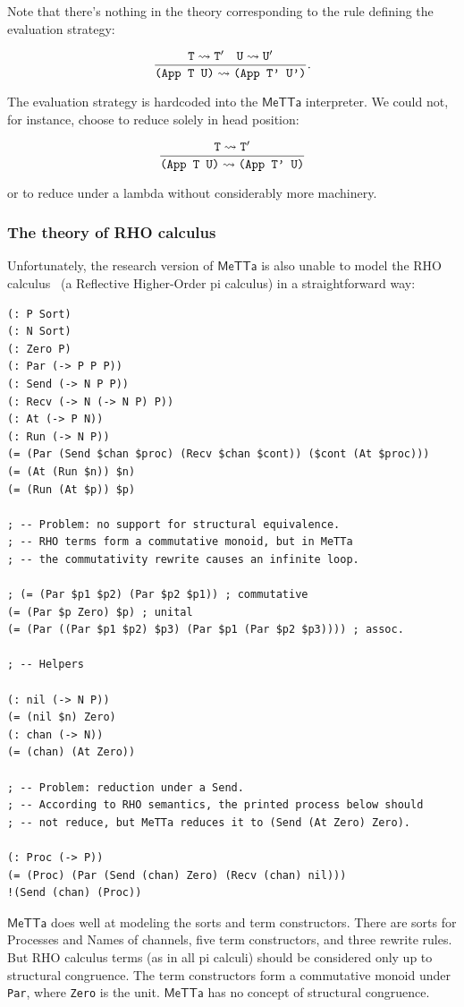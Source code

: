 \documentclass{article}
\begin{document}
Note that there's nothing in the theory corresponding to the rule
defining the evaluation strategy:

\[ \frac{{\tt T} \leadsto {\tt T'} \quad {\tt U} \leadsto {\tt U'}}{\mbox{\tt (App T U)} \leadsto \mbox{\tt (App T' U')}}. \]

The evaluation strategy is hardcoded into the $\mathsf{MeTTa}$
interpreter.  We could not, for instance, choose to reduce solely in
head position:

\[ \frac{{\tt T} \leadsto {\tt T'}}{\mbox{\tt (App T U)} \leadsto \mbox{\tt (App T' U)}} \]

or to reduce under a lambda without considerably more machinery.

\subsubsection{The theory of RHO calculus}

Unfortunately, the research version of $\mathsf{MeTTa}$ is also unable
to model the RHO calculus~\cite{MeredithRadestock2005} (a Reflective
Higher-Order pi calculus) in a straightforward way:

\begin{verbatim}
(: P Sort)
(: N Sort)
(: Zero P)
(: Par (-> P P P))
(: Send (-> N P P))
(: Recv (-> N (-> N P) P))
(: At (-> P N))
(: Run (-> N P))
(= (Par (Send $chan $proc) (Recv $chan $cont)) ($cont (At $proc)))
(= (At (Run $n)) $n)
(= (Run (At $p)) $p)

; -- Problem: no support for structural equivalence.
; -- RHO terms form a commutative monoid, but in MeTTa
; -- the commutativity rewrite causes an infinite loop.

; (= (Par $p1 $p2) (Par $p2 $p1)) ; commutative
(= (Par $p Zero) $p) ; unital
(= (Par ((Par $p1 $p2) $p3) (Par $p1 (Par $p2 $p3)))) ; assoc.

; -- Helpers

(: nil (-> N P))
(= (nil $n) Zero)
(: chan (-> N))
(= (chan) (At Zero))

; -- Problem: reduction under a Send.
; -- According to RHO semantics, the printed process below should
; -- not reduce, but MeTTa reduces it to (Send (At Zero) Zero).

(: Proc (-> P))
(= (Proc) (Par (Send (chan) Zero) (Recv (chan) nil)))
!(Send (chan) (Proc))
\end{verbatim}

\noindent $\mathsf{MeTTa}$ does well at modeling the sorts and term
constructors.  There are sorts for Processes and Names of channels,
five term constructors, and three rewrite rules.  But RHO calculus
terms (as in all pi calculi) should be considered only up to
structural congruence.  The term constructors form a commutative
monoid under \verb+Par+, where \verb+Zero+ is the unit.
$\mathsf{MeTTa}$ has no concept of structural congruence.
\end{document}
